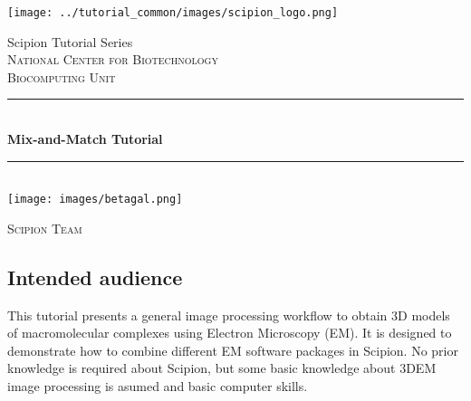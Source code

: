 \documentclass[12pt]{article} %
\begin{document}

\begin{titlepage}

\newcommand{\HRule}{\rule{\linewidth}{0.5mm}}

\center %

\texttt{[image: ../tutorial\_common/images/scipion\_logo.png]}

{\large Scipion Tutorial Series}\\[1.0cm]

\textsc{\LARGE National Center for Biotechnology}\\[0.5cm]
\textsc{\Large Biocomputing Unit}\\[0.5cm]

\HRule\\[0.4cm]
{ \huge \bfseries Mix-and-Match Tutorial}\\[0.4cm] %
\HRule \\[1.5cm]


\texttt{[image: images/betagal.png]}

\vfill %
\begin{flushright}
 \large
  \textsc{Scipion Team} %
\end{flushright}

\end{titlepage}




\subsection*{Intended audience}

This tutorial presents a general image processing workflow to obtain
3D models of macromolecular complexes using Electron Microscopy (EM).
It is designed to demonstrate how to combine
different EM software packages in Scipion. No prior knowledge is required
about Scipion, but some basic knowledge about 3DEM image processing is asumed
and basic computer skills.
\end{document}
